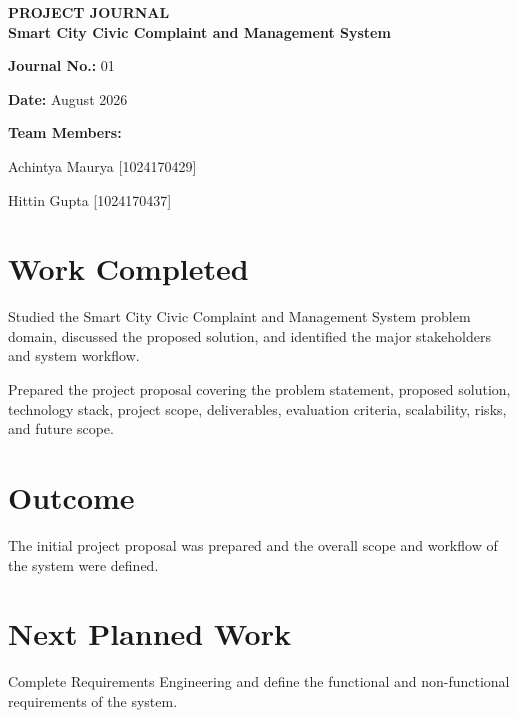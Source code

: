 \documentclass[12pt,a4paper]{article}
\begin{document}
\begin{center}
    {\Large \textbf{PROJECT JOURNAL}}\\[0.5cm]
    {\large \textbf{Smart City Civic Complaint and Management System}}
\end{center}

\textbf{Journal No.:} 01

\textbf{Date:} August 2026

\textbf{Team Members:}

Achintya Maurya [1024170429]

Hittin Gupta [1024170437]

\section*{Work Completed}

Studied the Smart City Civic Complaint and Management System problem domain, discussed the proposed solution, and identified the major stakeholders and system workflow.

Prepared the project proposal covering the problem statement, proposed solution, technology stack, project scope, deliverables, evaluation criteria, scalability, risks, and future scope.

\section*{Outcome}

The initial project proposal was prepared and the overall scope and workflow of the system were defined.

\section*{Next Planned Work}

Complete Requirements Engineering and define the functional and non-functional requirements of the system.
\end{document}
